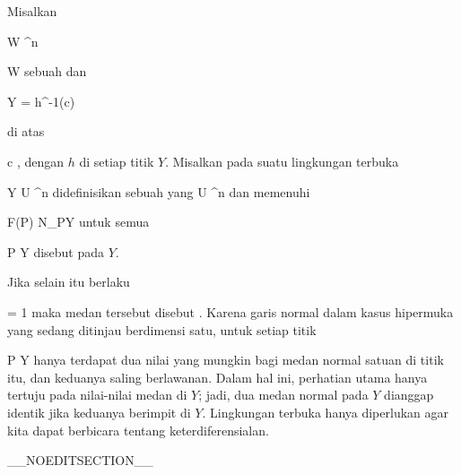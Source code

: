 {}
{

Misalkan

\mavergleichskette
{\vergleichskette
{ W
}
{ \subseteq }{ \R^n
}
{  }{
}
{    }{
}
{   }{
}
}
{}{}{}

 { W } { \R
} {}
sebuah
dan

\mavergleichskette
{\vergleichskette
{ Y
}
{ = }{ h^{-1}(c)
}
{  }{
}
{    }{
}
{   }{
}
}
{}{}{}

di atas

\mavergleichskette
{\vergleichskette
{ c
}
{ \in }{ \R
}
{  }{
}
{    }{
}
{   }{
}
}
{}{}{,}
dengan $h$
di setiap titik $Y$. Misalkan pada suatu lingkungan terbuka

\mavergleichskette
{\vergleichskette
{ Y
}
{ \subseteq }{ U
}
{ \subseteq }{ \R^n
}
{    }{
}
{   }{
}
}
{}{}{}
didefinisikan sebuah
yang
 {U} {\R^n
} {}
dan memenuhi

\mavergleichskettedisp
{\vergleichskette
{ F(P)
}
{ \in} { N_PY
}
{ } {
}
{ } {
}
{ } {
}
}
{}{}{}
untuk semua

\mavergleichskette
{\vergleichskette
{ P
}
{ \in }{ Y
}
{  }{
}
{    }{
}
{   }{
}
}
{}{}{}
disebut
pada $Y$.

}

Jika selain itu berlaku

\mavergleichskettedisp
{\vergleichskette
{  \Vert
}
{ =} { 1
}
{ } {
}
{ } {
}
{ } {
}
}
{}{}{}
maka medan tersebut disebut 
 {.} Karena garis normal dalam kasus hipermuka yang sedang ditinjau berdimensi satu, untuk setiap titik

\mavergleichskette
{\vergleichskette
{ P
}
{ \in }{ Y
}
{  }{
}
{    }{
}
{   }{
}
}
{}{}{}
hanya terdapat dua nilai yang mungkin bagi medan normal satuan di titik itu, dan keduanya saling berlawanan. Dalam hal ini, perhatian utama hanya tertuju pada nilai-nilai medan di $Y$; jadi, dua medan normal pada $Y$ dianggap identik jika keduanya berimpit di $Y$. Lingkungan terbuka hanya diperlukan agar kita dapat berbicara tentang keterdiferensialan.

__NOEDITSECTION__


